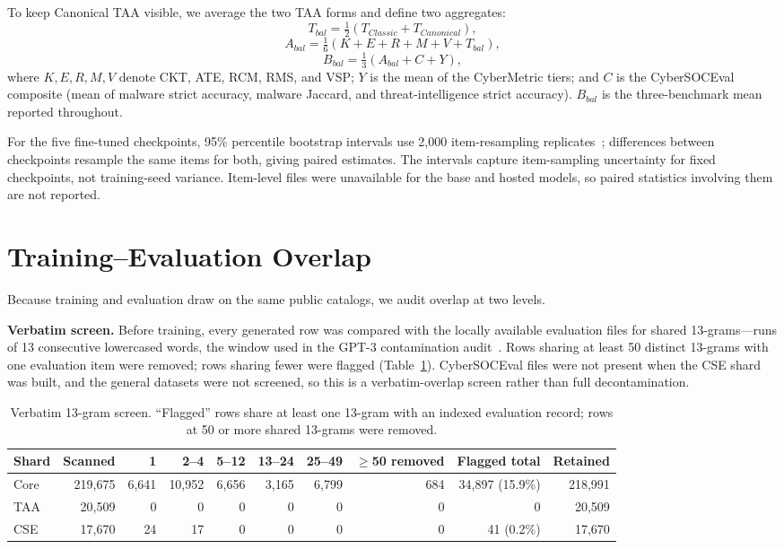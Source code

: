 \documentclass[conference]{IEEEtran}
\begin{document}
To keep Canonical TAA visible, we average the two TAA forms and define two aggregates:
\begin{equation}
T_{bal}=\tfrac{1}{2}(T_{Classic}+T_{Canonical}),
\end{equation}
\begin{equation}
A_{bal}=\tfrac{1}{6}(K+E+R+M+V+T_{bal}),
\end{equation}
\begin{equation}
B_{bal}=\tfrac{1}{3}(A_{bal}+C+Y),
\end{equation}
where $K,E,R,M,V$ denote CKT, ATE, RCM, RMS, and VSP; $Y$ is the mean of the CyberMetric tiers; and $C$ is the CyberSOCEval composite (mean of malware strict accuracy, malware Jaccard, and threat-intelligence strict accuracy). $B_{bal}$ is the three-benchmark mean reported throughout.

For the five fine-tuned checkpoints, 95\% percentile bootstrap intervals use 2,000 item-resampling replicates~\cite{efron1993bootstrap}; differences between checkpoints resample the same items for both, giving paired estimates. The intervals capture item-sampling uncertainty for fixed checkpoints, not training-seed variance. Item-level files were unavailable for the base and hosted models, so paired statistics involving them are not reported.

\section{Training--Evaluation Overlap}\label{sec:overlap}
Because training and evaluation draw on the same public catalogs, we audit overlap at two levels.

\textbf{Verbatim screen.} Before training, every generated row was compared with the locally available evaluation files for shared 13-grams---runs of 13 consecutive lowercased words, the window used in the GPT-3 contamination audit~\cite{brown2020language}. Rows sharing at least 50 distinct 13-grams with one evaluation item were removed; rows sharing fewer were flagged (Table~\ref{tab:contam}). CyberSOCEval files were not present when the CSE shard was built, and the general datasets were not screened, so this is a verbatim-overlap screen rather than full decontamination.

\begin{table}[t]
\caption{Verbatim 13-gram screen. ``Flagged'' rows share at least one 13-gram with an indexed evaluation record; rows at 50 or more shared 13-grams were removed.}
\label{tab:contam}
\centering
\scriptsize
\setlength{\tabcolsep}{3.0pt}
\begin{tabular}{@{}lrrrrrrrrr@{}}
\toprule
Shard & Scanned & 1 & 2--4 & 5--12 & 13--24 & 25--49 & $\geq$50 removed & Flagged total & Retained \\
\midrule
Core & 219,675 & 6,641 & 10,952 & 6,656 & 3,165 & 6,799 & 684 & 34,897 (15.9\%) & 218,991 \\
TAA & 20,509 & 0 & 0 & 0 & 0 & 0 & 0 & 0 & 20,509 \\
CSE & 17,670 & 24 & 17 & 0 & 0 & 0 & 0 & 41 (0.2\%) & 17,670 \\
\bottomrule
\end{tabular}
\end{table}
\end{document}
